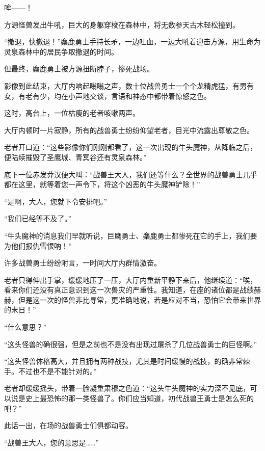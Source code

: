 
\begin{this_body}



哞——！

方源怪兽发出牛吼，巨大的身躯穿梭在森林中，将无数参天古木轻松撞到。

“撤退，快撤退！”麋鹿勇士手持长矛，一边吐血，一边大吼着迎击方源，用生命为灵泉森林中的居民争取撤退的时间。

但最终，麋鹿勇士被方源扭断脖子，惨死战场。

影像到此结束，大厅内响起嗡嗡之声，数十位战兽勇士一个个龙精虎猛，有男有女，有老有少，均在小声地交谈，言语和神态中都带着惊怒之色。

这时，高台上，一位枯瘦的老者咳嗽两声。

大厅内顿时一片寂静，所有的战兽勇士纷纷仰望老者，目光中流露出尊敬之色。

老者开口道：“这些影像你们刚刚都看了，这一次出现的牛头魔神，从降临之后，便陆续摧毁了圣鹰城、青冥谷还有灵泉森林。”

底下一位赤发莽汉便大叫：“战兽王大人，我们还等什么？全世界的战兽勇士几乎都在这里，就等着您一声令下，将这个凶恶的牛头魔神铲除！”

“是啊，大人，您就下令安排吧。”

“我们已经等不及了。”

“牛头魔神的消息我们早就听说，巨鹰勇士、麋鹿勇士都惨死在它的手上，我们要为他们报仇雪恨呐！”

许多战兽勇士纷纷附言，一时间大厅内群情激奋。

老者只得伸出手掌，缓缓地压了一压，大厅内重新平静下来后，他继续道：“唉，看来你们还没有真正意识到这一次兽灾的严重性。我知道，在座的诸位都是战绩赫赫，但是这一次的怪兽非比寻常，更准确地说，若是应对不当，恐怕它会带来世界的末日！”

“什么意思？”

“这头怪兽的确很强，但是之前也不是没有出现过屠杀了几位战兽勇士的巨怪啊。”

“这头怪兽体格高大，并且拥有两种战技，尤其是时间缓慢的战技，的确非常棘手。不过也不是不能针对的。”

老者却缓缓摇头，带着一脸凝重肃穆之色道：“这头牛头魔神的实力深不见底，可以说是史上最恐怖的那一类怪兽了。你们应当知道，初代战兽王勇士是怎么死的吧？”

此话一出，在场的战兽勇士们俱都动容。

“战兽王大人，您的意思是……”


\end{this_body}
